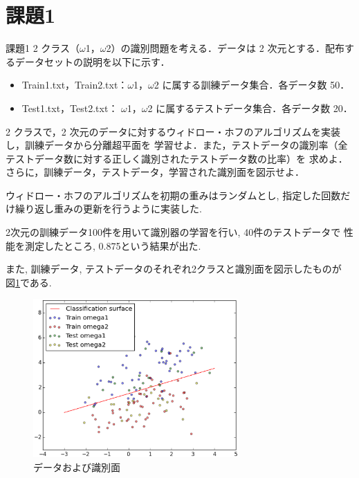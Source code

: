 \section{課題1}\label{section:kadai1}
\begin{itembox}{課題1}
2 クラス（$\omega$1，$\omega$2）の識別問題を考える．データは 2 次元とする．配布するデータセットの説明を以下に示す．

\begin{itemize}
  \item Train1.txt，Train2.txt：$\omega$1，$\omega$2 に属する訓練データ集合．各データ数 50．
  \item Test1.txt，Test2.txt： $\omega$1，$\omega$2 に属するテストデータ集合．各データ数 20．
\end{itemize}

2 クラスで，2 次元のデータに対するウィドロー・ホフのアルゴリズムを実装し，訓練データから分離超平面を
学習せよ．また，テストデータの識別率（全テストデータ数に対する正しく識別されたテストデータ数の比率）を
求めよ．さらに，訓練データ，テストデータ，学習された識別面を図示せよ．
\end{itembox}
ウィドロー・ホフのアルゴリズムを初期の重みはランダムとし, 
指定した回数だけ繰り返し重みの更新を行うように実装した. 

2次元の訓練データ100件を用いて識別器の学習を行い, 40件のテストデータで
性能を測定したところ, 0.875という結果が出た. 

また, 訓練データ, テストデータのそれぞれ2クラスと識別面を図示したものが
図\ref{fig:kadai1}である. 

\begin{figure}[htbp]
  \centering
  \includegraphics[width=0.7\textwidth]{./assets/kadai1_plot_20150122_031552.eps}
  \caption{データおよび識別面}
  \label{fig:kadai1}
\end{figure}

